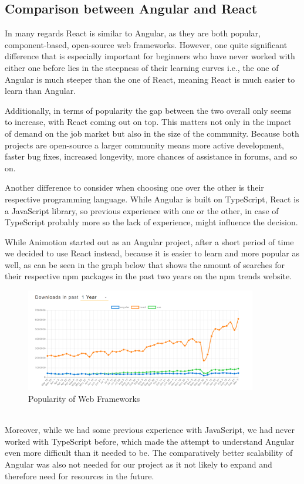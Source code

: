 \subsection{Comparison between Angular and React}
In many regards React is similar to Angular, as they are both popular, component-based, open-source web frameworks. However, one 
quite significant difference that is especially important for beginners who have never worked with either one before lies in the 
steepness of their learning curves i.e., the one of Angular is much steeper than the one of React, meaning React is much easier 
to learn than Angular.

Additionally, in terms of popularity the gap between the two overall only seems to increase, with React coming out on top. This 
matters not only in the impact of demand on the job market but also in the size of the community. Because both projects are 
open-source a larger community means more active development, faster bug fixes, increased longevity, more chances of assistance 
in forums, and so on.

Another difference to consider when choosing one over the other is their respective programming language. While Angular is built
on TypeScript, React is a JavaScript library, so previous experience with one or the other, in case of TypeScript probably
more so the lack of experience, might influence the decision. \cite{AngularReactComparison}

While Animotion started out as an Angular project, after a short period of time we decided to use React instead, because it 
is easier to learn and more popular as well, as can be seen in the graph below that shows the amount of searches for their 
respective npm packages in the past two years on the npm trends website. \cite{AngularReactPopularity}
\\
\begin{figure}[htb]
  \centering
  \includegraphics[width=0.9\textwidth]{pics/webframeworkpop.png}
  \caption{Popularity of Web Frameworks}
  \label{fig:webpop}
\end{figure}
\\
Moreover, while we had some previous experience with JavaScript, we had never worked with TypeScript before, which made the attempt 
to understand Angular even more difficult than it needed to be. The comparatively better scalability of Angular was also not needed
for our project as it not likely to expand and therefore need for resources in the future.

